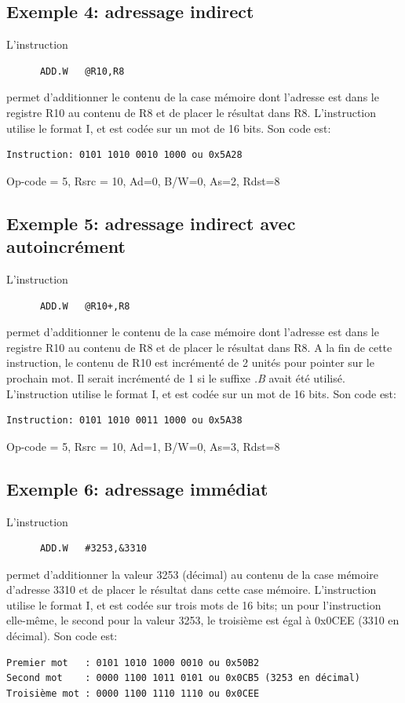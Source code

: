 \subsection{Exemple 4: adressage indirect}
L'instruction
\lstset{style=customc}
\begin{lstlisting}
      ADD.W   @R10,R8
\end{lstlisting}
permet d'additionner le contenu de la case mémoire dont l'adresse est dans le registre R10 au contenu de R8 et de placer le résultat dans R8.
L'instruction utilise le format I, et est codée sur un mot de 16 bits.
Son code est:
\lstset{style=customc}
\begin{lstlisting}
Instruction: 0101 1010 0010 1000 ou 0x5A28
\end{lstlisting}

Op-code = 5, Rsrc = 10, Ad=0, B/W=0, As=2, Rdst=8

\subsection{Exemple 5: adressage indirect avec autoincrément}
L'instruction
\lstset{style=customc}
\begin{lstlisting}
      ADD.W   @R10+,R8
\end{lstlisting}
permet d'additionner le contenu de la case mémoire dont l'adresse est dans le registre R10 au contenu de R8 et de placer le résultat dans R8. A la fin de cette instruction, le contenu de R10 est incrémenté de 2 unités pour pointer sur le prochain mot. Il serait incrémenté de 1 si le suffixe \textit{.B} avait été utilisé.
L'instruction utilise le format I, et est codée sur un mot de 16 bits.
Son code est:
\lstset{style=customc}
\begin{lstlisting}
Instruction: 0101 1010 0011 1000 ou 0x5A38
\end{lstlisting}

Op-code = 5, Rsrc = 10, Ad=1, B/W=0, As=3, Rdst=8

\subsection{Exemple 6: adressage immédiat}
L'instruction
\lstset{style=customc}
\begin{lstlisting}
      ADD.W   #3253,&3310
\end{lstlisting}
permet d'additionner la valeur 3253 (décimal) au contenu de la case mémoire d'adresse 3310 et de placer le résultat dans cette case mémoire.
L'instruction utilise le format I, et est codée sur trois mots de 16 bits; un pour l'instruction elle-même, le second pour la valeur 3253, le troisième est égal à 0x0CEE (3310 en décimal).
Son code est:
\lstset{style=customc}
\begin{lstlisting}
Premier mot   : 0101 1010 1000 0010	ou 0x50B2
Second mot    : 0000 1100 1011 0101 ou 0x0CB5 (3253 en décimal)
Troisième mot : 0000 1100 1110 1110 ou 0x0CEE
\end{lstlisting}

